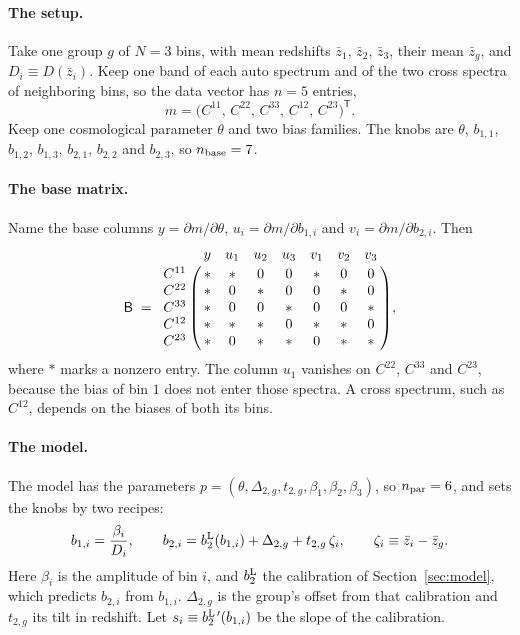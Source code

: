 \documentclass[11pt]{article}
\newcommand{\T}{^{\mathsf{T}}}
\newcommand{\mB}{\mathsf{B}}
\newcommand{\nbase}{n_{\rm base}}
\newcommand{\npar}{n_{\rm par}}
\begin{document}
\paragraph{The setup.}
Take one group $g$ of $N = 3$ bins, with mean redshifts $\bar{z}_1$,
$\bar{z}_2$, $\bar{z}_3$, their mean $\bar{z}_g$, and
$D_i \equiv D(\bar{z}_i)$.  Keep one band of each auto spectrum and of
the two cross spectra of neighboring bins, so the data vector has
$n = 5$ entries,
\begin{equation}
  m = \bigl(C^{11},\, C^{22},\, C^{33},\, C^{12},\, C^{23}\bigr)\T .
\end{equation}
Keep one cosmological parameter $\theta$ and two bias families.  The
knobs are $\theta$, $b_{1,1}$, $b_{1,2}$, $b_{1,3}$, $b_{2,1}$, $b_{2,2}$
and $b_{2,3}$, so $\nbase = 7$.

\paragraph{The base matrix.}
Name the base columns $y = \partial m/\partial\theta$,
$u_i = \partial m/\partial b_{1,i}$ and
$v_i = \partial m/\partial b_{2,i}$.  Then
\begin{equation}
  \mB \;=\; \bordermatrix{
           & y    & u_1  & u_2  & u_3  & v_1  & v_2  & v_3  \cr
    C^{11} & \ast & \ast & 0    & 0    & \ast & 0    & 0    \cr
    C^{22} & \ast & 0    & \ast & 0    & 0    & \ast & 0    \cr
    C^{33} & \ast & 0    & 0    & \ast & 0    & 0    & \ast \cr
    C^{12} & \ast & \ast & \ast & 0    & \ast & \ast & 0    \cr
    C^{23} & \ast & 0    & \ast & \ast & 0    & \ast & \ast \cr} ,
  \label{eq:toyB}
\end{equation}
where $\ast$ marks a nonzero entry.  The column $u_1$ vanishes on
$C^{22}$, $C^{33}$ and $C^{23}$, because the bias of bin $1$ does not
enter those spectra.  A cross spectrum, such as $C^{12}$, depends on the
biases of both its bins.

\paragraph{The model.}
The model has the parameters
$p = (\theta, \Delta_{2,g}, t_{2,g}, \beta_1, \beta_2, \beta_3)$, so
$\npar = 6$, and sets the knobs by two recipes:
\begin{equation}
  b_{1,i} = \frac{\beta_i}{D_i} ,
  \qquad
  b_{2,i} = b_2^{\rm L}(b_{1,i}) + \Delta_{2,g} + t_{2,g}\,\zeta_i ,
  \qquad
  \zeta_i \equiv \bar{z}_i - \bar{z}_g .
  \label{eq:toymodel}
\end{equation}
Here $\beta_i$ is the amplitude of bin $i$, and $b_2^{\rm L}$ the
calibration of Section~\ref{sec:model}, which predicts $b_{2,i}$ from
$b_{1,i}$.  $\Delta_{2,g}$ is the group's offset from that calibration
and $t_{2,g}$ its tilt in redshift.  Let
$s_i \equiv b_2^{\rm L\,\prime}(b_{1,i})$ be the slope of the
calibration.
\end{document}
